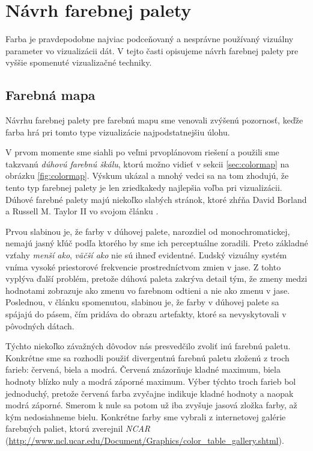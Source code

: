 \section{Návrh farebnej palety}
Farba je pravdepodobne najviac podceňovaný a nesprávne používaný vizuálny parameter vo vizualizácii dát. V tejto časti opisujeme návrh farebnej palety pre vyššie spomenuté vizualizačné techniky.

\subsection{Farebná mapa}
Návrhu farebnej palety pre farebnú mapu sme venovali zvýšenú pozornosť, keďže farba hrá pri tomto type vizualizácie najpodstatnejšiu úlohu.

V prvom momente sme siahli po veľmi prvoplánovom riešení a použili sme takzvanú \textit{dúhovú farebnú škálu}, ktorú možno vidieť v sekcii \ref{sec:colormap} na obrázku \ref{fig:colormap}. Výskum ukázal a mnohý vedci sa na tom zhodujú, že tento typ farebnej palety je len zriedkakedy najlepšia voľba pri vizualizácii. Dúhové farebné palety majú niekoľko slabých stránok, ktoré zhŕňa David Borland a Russell M. Taylor II vo svojom článku \cite{RainbowHarmful}.

Prvou slabinou je, že farby v dúhovej palete, narozdiel od monochromatickej, nemajú jasný kľúč podľa ktorého by sme ich perceptuálne zoradili. Preto základné vzťahy \textit{menší ako}, \textit{väčší ako} nie sú ihneď evidentné. Ľudský vizuálny systém vníma vysoké priestorové frekvencie prostredníctvom zmien v jase. Z tohto vyplýva ďalší problém, pretože dúhová paleta zakrýva detail tým, že zmeny medzi hodnotami zobrazuje ako zmenu vo farebnom odtieni a nie ako zmenu v jase. Poslednou, v článku spomenutou, slabinou je, že farby v dúhovej palete sa spájajú do pásem, čím pridáva do obrazu artefakty, ktoré sa nevyskytovali v pôvodných dátach. 

Týchto niekoľko závažných dôvodov nás presvedčilo zvoliť inú farebnú paletu. Konkrétne sme sa rozhodli použiť divergentnú farebnú paletu zloženú z troch farieb: červená, biela a modrá. Červená znázorňuje kladné maximum, biela hodnoty blízko nuly a modrá záporné maximum. Výber týchto troch farieb bol jednoduchý, pretože červená farba zvyčajne indikuje kladné hodnoty a naopak modrá záporné. Smerom k nule sa potom už iba zvyšuje jasová zložka farby, až kým nedosiahneme bielu. Konkrétne farby sme vybrali z internetovej galérie farebných paliet, ktorú zverejnil \textit{NCAR} (\url{http://www.ncl.ucar.edu/Document/Graphics/color_table_gallery.shtml}).

